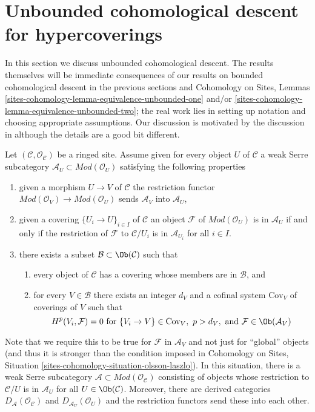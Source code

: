 \section{Unbounded cohomological descent for hypercoverings}
\label{section-unbounded-cohomological-descent}

\noindent
In this section we discuss unbounded cohomological descent.
The results themselves will be immediate consequences of
our results on bounded cohomological descent in the previous
sections and Cohomology on Sites, Lemmas
\ref{sites-cohomology-lemma-equivalence-unbounded-one} and/or
\ref{sites-cohomology-lemma-equivalence-unbounded-two}; the real work lies
in setting up notation and choosing appropriate assumptions.
Our discussion is motivated by the discussion in \cite{six-I}
although the details are a good bit different.

\medskip\noindent
Let $(\mathcal{C}, \mathcal{O}_\mathcal{C})$ be a ringed site.
Assume given for every object $U$ of $\mathcal{C}$
a weak Serre subcategory $\mathcal{A}_U \subset \textit{Mod}(\mathcal{O}_U)$
satisfying the following properties
\begin{enumerate}
\item
\label{item-restriction}
given a morphism $U \to V$ of $\mathcal{C}$ the restriction
functor $\textit{Mod}(\mathcal{O}_V) \to \textit{Mod}(\mathcal{O}_U)$
sends $\mathcal{A}_V$ into $\mathcal{A}_U$,
\item
\label{item-local}
given a covering $\{U_i \to U\}_{i \in I}$ of $\mathcal{C}$
an object $\mathcal{F}$ of $\textit{Mod}(\mathcal{O}_U)$
is in $\mathcal{A}_U$ if and only if the restriction of
$\mathcal{F}$ to $\mathcal{C}/U_i$ is in $\mathcal{A}_{U_i}$
for all $i \in I$.
\item
\label{item-bounded-dimension}
there exists a subset $\mathcal{B} \subset \Ob(\mathcal{C})$
such that
\begin{enumerate}
\item every object of $\mathcal{C}$ has a covering whose
members are in $\mathcal{B}$, and
\item for every $V \in \mathcal{B}$ there exists an integer $d_V$
and a cofinal system $\text{Cov}_V$ of coverings of $V$ such
that
$$
H^p(V_i, \mathcal{F}) = 0 \text{ for }
\{V_i \to V\} \in \text{Cov}_V,\ p > d_V, \text{ and }
\mathcal{F} \in \Ob(\mathcal{A}_V)
$$
\end{enumerate}
\end{enumerate}
Note that we require this to be true for $\mathcal{F}$ in
$\mathcal{A}_V$ and not just for ``global'' objects
(and thus it is stronger than the condition imposed in
Cohomology on Sites, Situation \ref{sites-cohomology-situation-olsson-laszlo}).
In this situation, there is a weak Serre subcategory
$\mathcal{A} \subset \textit{Mod}(\mathcal{O}_\mathcal{C})$
consisting of objects whose restriction to $\mathcal{C}/U$
is in $\mathcal{A}_U$ for all $U \in \Ob(\mathcal{C})$.
Moreover, there are derived categories
$D_\mathcal{A}(\mathcal{O}_\mathcal{C})$ and
$D_{\mathcal{A}_U}(\mathcal{O}_U)$ and the restriction
functors send these into each other.

